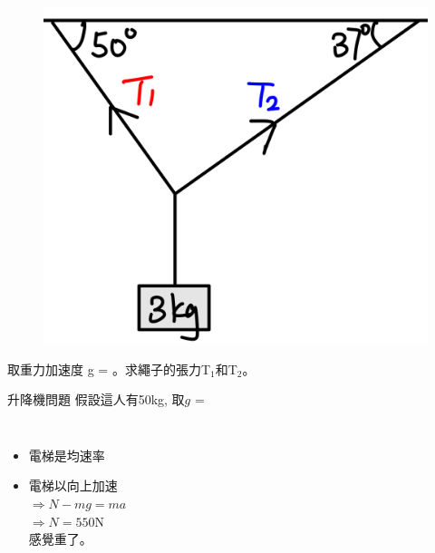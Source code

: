 \documentclass[beamer=true]{standalone}
\begin{document}
\begin{eg}
    \begin{figure}[h!]
        \centering
        \includegraphics[width=.3\textwidth]{assets/ce5681cb.png}
    \end{figure}
    取重力加速度 g = 。求繩子的張力T$_1$和T$_2$。
\end{eg}

\begin{frame}{升降機問題}
    假設這人有50kg, 取$g$ = 

    \begin{columns}
        \begin{itemize}
            \setlength{\itemsep}{10pt}
            \item 電梯是均速率
            \item 電梯以向上加速\\$\Rightarrow N-mg=ma$\\$\Rightarrow N=550$N\\感覺重了。


\end{itemize}
\end{columns}
\end{frame}
\end{document}
